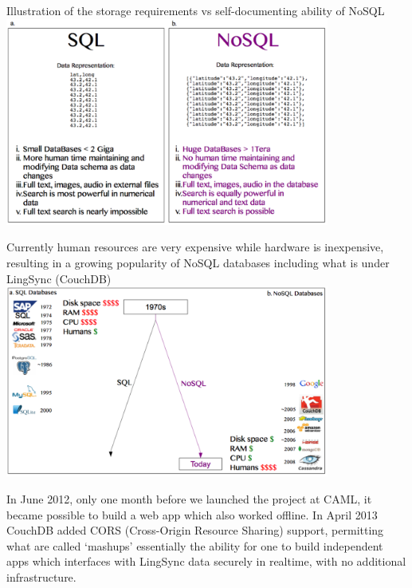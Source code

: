 \documentclass[12pt]{article}
\begin{document}
\begin{exe}

  \ex   Illustration of the storage requirements vs self-documenting ability of NoSQL
  \centering
    \includegraphics[width=0.8\textwidth]{figures/whynosql}

\label{ex:whynosql}
\end{exe}


\begin{exe}

  \ex   Currently human resources are very expensive while hardware is inexpensive, resulting in a growing popularity of NoSQL databases including what is under LingSync (CouchDB)
  \centering
    \includegraphics[width=0.8\textwidth]{figures/databasetrends}

\label{ex:databasetrends}
\end{exe}


In June 2012, only one month before we launched the project at CAML, it became possible to build a web app which also worked offline. 
 In April 2013 CouchDB added CORS (Cross-Origin Resource Sharing) support,  permitting what are called `mashups' essentially the ability for one to build  independent apps which interfaces with LingSync data securely in realtime, with no additional infrastructure. 
\end{document}
